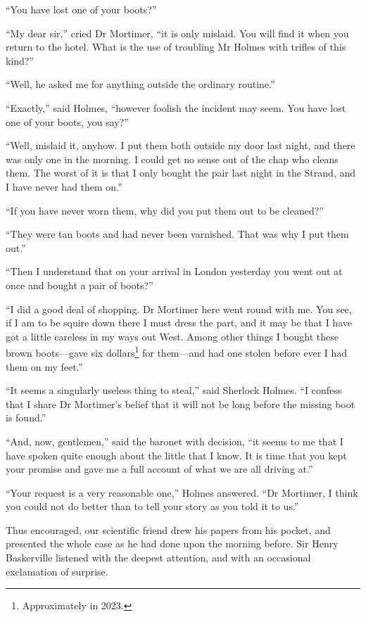 \documentclass[paper=5.5in:8.5in,BCOR=7mm,twoside,DIV=calc,12pt,usegeometry,openany,chapterprefix,endperiod]{scrbook} %
\begin{document}
\enquote{You have lost one of your boots?}

\enquote{My dear sir,} cried Dr Mortimer, \enquote{it is only mislaid. You will find it when you return to the hotel. What is the use of troubling Mr Holmes with trifles of this kind?}

\enquote{Well, he asked me for anything outside the ordinary routine.}

\enquote{Exactly,} said Holmes, \enquote{however foolish the incident may seem. You have lost one of your boots, you say?}

\enquote{Well, mislaid it, anyhow. I put them both outside my door last night, and there was only one in the morning. I could get no sense out of the chap who cleans them. The worst of it is that I only bought the pair last night in the Strand, and I have never had them on.}

\enquote{If you have never worn them, why did you put them out to be cleaned?}

\enquote{They were tan boots and had never been varnished. That was why I put them out.}

\enquote{Then I understand that on your arrival in London yesterday you went out at once and bought a pair of boots?}

\enquote{I did a good deal of shopping. Dr Mortimer here went round with me. You see, if I am to be squire down there I must dress the part, and it may be that I have got a little careless in my ways out West. Among other things I bought these brown boots\nobreakdash---gave six dollars\footnote{Approximately  in 2023.} for them\nobreakdash---and had one stolen before ever I had them on my feet.}

\enquote{It seems a singularly useless thing to steal,} said Sherlock Holmes. \enquote{I confess that I share Dr Mortimer's belief that it will not be long before the missing boot is found.}

\enquote{And, now, gentlemen,} said the baronet with decision, \enquote{it seems to me that I have spoken quite enough about the little that I know. It is time that you kept your promise and gave me a full account of what we are all driving at.}

\enquote{Your request is a very reasonable one,} Holmes answered. \enquote{Dr Mortimer, I think you could not do better than to tell your story as you told it to us.}

Thus encouraged, our scientific friend drew his papers from his pocket, and presented the whole case as he had done upon the morning before. Sir Henry Baskerville listened with the deepest attention, and with an occasional exclamation of surprise.
\end{document}
